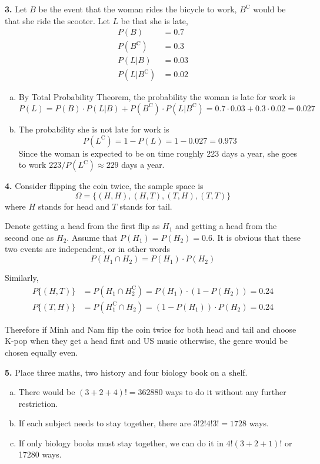\documentclass[a4paper,12pt]{article}
\newcommand{\C}{\mathrm C}
\newcommand{\exercise}[1]{\noindent\textbf{#1.}}
\begin{document}
\exercise 3  Let $B$ be the event that the woman rides the bicycle to work,
$B^\C$ would be that she ride the scooter.  Let $L$ be that she is late,
\begin{align*}
  P(B) &= 0.7\\
  P\left(B^\C\right) &= 0.3\\
  P(L|B) &= 0.03\\
  P\left(L|B^\C\right) &= 0.02
\end{align*}
\begin{enumerate}[(a)]
  \item By Total Probability Theorem, the probability the woman
    is late for work is
    \[P(L) = P(B)\cdot P(L|B) + P\left(B^\C\right)\cdot P\left(L|B^\C\right)
    = 0.7\cdot 0.03 + 0.3\cdot 0.02 = 0.027\]
  \item The probability she is not late for work is
    \[P\left(L^\C\right) = 1 - P(L) = 1 - 0.027 = 0.973\]
    Since the woman is expected to be on time roughly 223 days a year,
    she goes to work $223 / P\left(L^\C\right) \approx 229$ days a year.
\end{enumerate}

\exercise 4  Consider flipping the coin twice, the sample space is
\[\Omega = \{(H, H), (H, T), (T, H), (T, T)\}\]
where $H$ stands for head and $T$ stands for tail.

Denote getting a head from the first flip as $H_1$ and getting a head
from the second one as $H_2$.  Assume that $P(H_1) = P(H_2) = 0.6$.
It is obvious that these two events are independent, or in other words
\[P(H_1\cap H_2) = P(H_1)\cdot P(H_2)\]

Similarly,
\begin{align*}
  P\{(H, T)\} &= P\left(H_1\cap H_2^\C\right)
  = P\left(H_1\right)\cdot\left(1 - P\left(H_2\right)\right) = 0.24\\
  P\{(T, H)\} &= P\left(H_1^\C\cap H_2\right)
  = \left(1 - P\left(H_1\right)\right)\cdot P\left(H_2\right) = 0.24
\end{align*}

Therefore if Minh and Nam flip the coin twice for both head and tail
and choose K-pop when they get a head first and US music otherwise,
the genre would be chosen equally even.

\exercise 5  Place three maths, two history and four biology book on a shelf.
\begin{enumerate}[(a)]
  \item There would be $(3 + 2 + 4)! = 362880$ ways to do it
    without any further restriction.
  \item If each subject needs to stay together,
    there are $3! 2! 4! 3! = 1728$ ways.
  \item If only biology books must stay together,
    we can do it in $4!(3 + 2 + 1)!$ or 17280 ways.
\end{enumerate}
\end{document}
